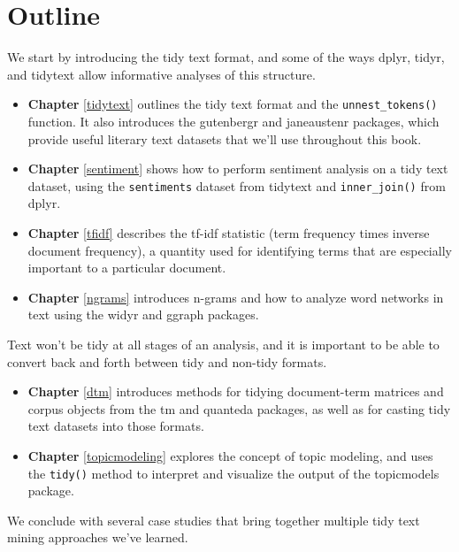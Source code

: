 \documentclass[
]{book}
\providecommand{\tightlist}{%
  \setlength{\itemsep}{0pt}\setlength{\parskip}{0pt}}
\begin{document}
\section*{Outline}\label{outline}

We start by introducing the tidy text format, and some of the ways dplyr, tidyr, and tidytext allow informative analyses of this structure.

\begin{itemize}
\tightlist
\item
  \textbf{Chapter} \ref{tidytext} outlines the tidy text format and the \texttt{unnest\_tokens()} function. It also introduces the gutenbergr and janeaustenr packages, which provide useful literary text datasets that we'll use throughout this book.
\item
  \textbf{Chapter} \ref{sentiment} shows how to perform sentiment analysis on a tidy text dataset, using the \texttt{sentiments} dataset from tidytext and \texttt{inner\_join()} from dplyr.
\item
  \textbf{Chapter} \ref{tfidf} describes the tf-idf statistic (term frequency times inverse document frequency), a quantity used for identifying terms that are especially important to a particular document.
\item
  \textbf{Chapter} \ref{ngrams} introduces n-grams and how to analyze word networks in text using the widyr and ggraph packages.
\end{itemize}

Text won't be tidy at all stages of an analysis, and it is important to be able to convert back and forth between tidy and non-tidy formats.

\begin{itemize}
\tightlist
\item
  \textbf{Chapter} \ref{dtm} introduces methods for tidying document-term matrices and corpus objects from the tm and quanteda packages, as well as for casting tidy text datasets into those formats.
\item
  \textbf{Chapter} \ref{topicmodeling} explores the concept of topic modeling, and uses the \texttt{tidy()} method to interpret and visualize the output of the topicmodels package.
\end{itemize}

We conclude with several case studies that bring together multiple tidy text mining approaches we've learned.
\end{document}
